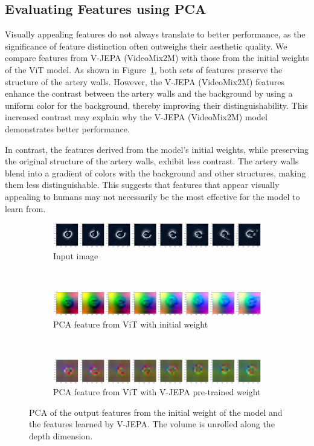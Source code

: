 \documentclass[a4paper,11pt,oneside]{report}
\begin{document}
\subsection{Evaluating Features using PCA}
Visually appealing features do not always translate to better performance, as the significance of feature distinction often outweighs their aesthetic quality. We compare features from V-JEPA (VideoMix2M) with those from the initial weights of the ViT model. As shown in Figure~\ref{fig:visually-good-features}, both sets of features preserve the structure of the artery walls. However, the V-JEPA (VideoMix2M) features enhance the contrast between the artery walls and the background by using a uniform color for the background, thereby improving their distinguishability. This increased contrast may explain why the V-JEPA (VideoMix2M) model demonstrates better performance. 

In contrast, the features derived from the model's initial weights, while preserving the original structure of the artery walls, exhibit less contrast. The artery walls blend into a gradient of colors with the background and other structures, making them less distinguishable. This suggests that features that appear visually appealing to humans may not necessarily be the most effective for the model to learn from.

\begin{figure}[hbt]
    \centering
    \begin{subfigure}[t]{0.8\textwidth}
        \centering
        \includegraphics[width=0.9\linewidth]{figures/discussion_visual_vjepa_input.jpg}
        \caption{Input image}
    \end{subfigure}\\
    \begin{subfigure}[t]{0.8\textwidth}
        \centering
        \includegraphics[width=0.9\linewidth]{figures/discussion_visual_vjepa_initial.jpg}
        \caption{PCA feature from ViT with initial weight}
    \end{subfigure}\\
    \begin{subfigure}[t]{0.8\textwidth}
        \centering
        \includegraphics[width=0.9\linewidth]{figures/discussion_visual_vjepa_pretrained.jpg}
        \caption{PCA feature from ViT with V-JEPA pre-trained weight}
    \end{subfigure}
    \caption{PCA of the output features from the initial weight of the model and the features learned by V-JEPA. The volume is unrolled along the depth dimension.}
    \label{fig:visually-good-features}
\end{figure}
\end{document}
